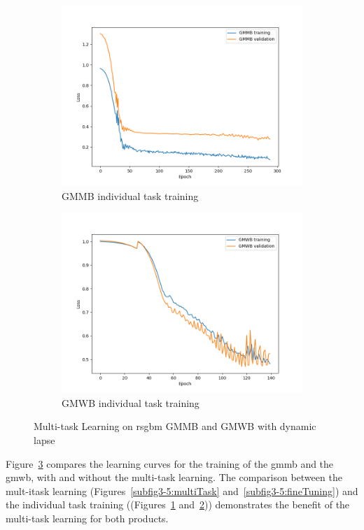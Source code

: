 \begin{figure}[ht!]
\begin{subfigure}{0.48\textwidth}
        \includegraphics[width=\textwidth]{./project3/figures/figure5c.png}
        \caption{GMMB individual task training} 
    \label{subfig3-5:gmmb_individual}
    \end{subfigure}\hfill
    \begin{subfigure}{0.48\textwidth}
        \includegraphics[width=\textwidth]{./project3/figures/figure5d.png}
        \caption{GMWB individual task training}
        \label{subfig3-5:gmwb_individual}
    \end{subfigure}
    \caption{Multi-task Learning on \gls{rsgbm} GMMB and GMWB with dynamic lapse}
    \label{fig3:figure5}
\end{figure}

Figure~\ref{fig3:figure5} compares the learning curves for the training of the \gls{gmmb} and the \gls{gmwb}, with and without the multi-task learning.
The comparison between the mult-itask learning (Figures~\ref{subfig3-5:multiTask} and~\ref{subfig3-5:fineTuning}) and the individual task training ((Figures~\ref{subfig3-5:gmmb_individual} and~\ref{subfig3-5:gmwb_individual})) demonstrates the benefit of the multi-task learning for both products. 

